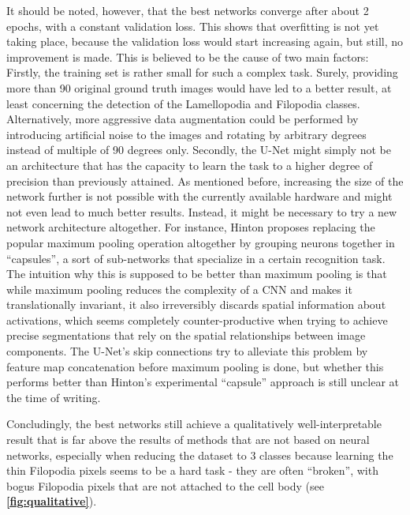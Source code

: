 It should be noted, however, that the best networks converge after about 2 epochs, with a constant validation loss. This shows that overfitting is not yet taking place, because the validation loss would start increasing again, but still, no improvement is made. This is believed to be the cause of two main factors: Firstly, the training set is rather small for such a complex task. Surely, providing more than 90 original ground truth images would have led to a better result, at least concerning the detection of the Lamellopodia and Filopodia classes. Alternatively, more aggressive data augmentation could be performed by introducing artificial noise to the images and rotating by arbitrary degrees instead of multiple of 90 degrees only. Secondly, the U-Net might simply not be an architecture that has the capacity to learn the task to a higher degree of precision than previously attained. As mentioned before, increasing the size of the network further is not possible with the currently available hardware and might not even lead to much better results. Instead, it might be necessary to try a new network architecture altogether. For instance, Hinton \cite{capsules} proposes replacing the popular maximum pooling operation altogether by grouping neurons together in ``capsules'', a sort of sub-networks that specialize in a certain recognition task. The intuition why this is supposed to be better than maximum pooling is that while maximum pooling reduces the complexity of a CNN and makes it translationally invariant, it also irreversibly discards spatial information about activations, which seems completely counter-productive when trying to achieve precise segmentations that rely on the spatial relationships between image components. The U-Net's skip connections try to alleviate this problem by feature map concatenation before maximum pooling is done, but whether this performs better than Hinton's experimental ``capsule'' approach is still unclear at the time of writing.

Concludingly, the best networks still achieve a qualitatively well-interpretable result that is far above the results of methods that are not based on neural networks, especially when reducing the dataset to 3 classes because learning the thin Filopodia pixels seems to be a hard task - they are often ``broken'', with bogus Filopodia pixels that are not attached to the cell body (see \textbf{\ref{fig:qualitative}}).